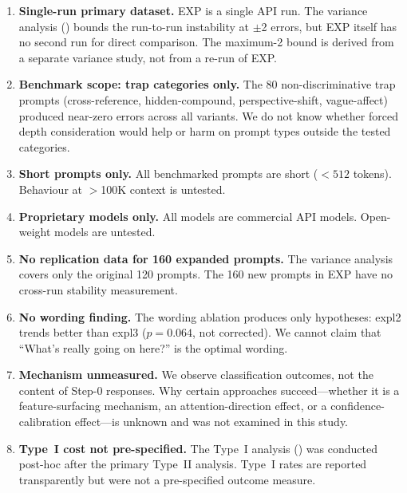 \documentclass[11pt,a4paper]{article}
\begin{document}
\begin{enumerate}[itemsep=2pt,topsep=4pt]
  \item \textbf{Single-run primary dataset.}  EXP is a single API run.
    The variance analysis () bounds the run-to-run
    instability at $\pm$2 errors, but EXP itself has no second run for
    direct comparison.  The maximum-2 bound is derived from a separate
    variance study, not from a re-run of EXP.

  \item \textbf{Benchmark scope: trap categories only.}  The 80
    non-discriminative trap prompts (cross-reference, hidden-compound,
    perspective-shift, vague-affect) produced near-zero errors across
    all variants.  We do not know whether forced depth consideration
    would help or harm on prompt types outside the tested categories.

  \item \textbf{Short prompts only.}  All benchmarked prompts are short
    ($<512$ tokens).  Behaviour at $>$100K context is untested.

  \item \textbf{Proprietary models only.}  All models are commercial
    API models.  Open-weight models are untested.

  \item \textbf{No replication data for 160 expanded prompts.}  The
    variance analysis covers only the original 120 prompts.  The 160
    new prompts in EXP have no cross-run stability measurement.

  \item \textbf{No wording finding.}  The wording ablation produces
    only hypotheses: \textsf{expl2} trends better than \textsf{expl3}
    ($p = 0.064$, not corrected).  We cannot claim that ``What's really
    going on here?'' is the optimal wording.

  \item \textbf{Mechanism unmeasured.}  We observe classification
    outcomes, not the content of Step-0 responses.  Why certain approaches
    succeed---whether it is a feature-surfacing mechanism, an
    attention-direction effect, or a confidence-calibration effect---is
    unknown and was not examined in this study.

  \item \textbf{Type~I cost not pre-specified.}  The Type~I analysis
    () was conducted post-hoc after the primary Type~II
    analysis.  Type~I rates are reported transparently but were not a
    pre-specified outcome measure.


\end{enumerate}
\end{document}
